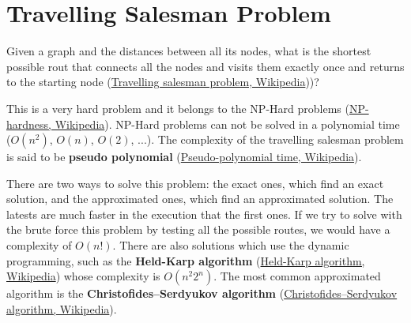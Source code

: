 \section{Travelling Salesman Problem}
Given a graph and the distances between all its nodes, what is the shortest possible rout that connects all the nodes and visits them exactly once and returns to the starting node \cite{wikitravsales} (\href{https://en.wikipedia.org/wiki/Travelling_salesman_problem}{Travelling salesman problem, Wikipedia}))?

This is a very hard problem and it belongs to the NP-Hard problems \cite{wikihphard} (\href{https://en.wikipedia.org/wiki/NP-hardness}{NP-hardness, Wikipedia}). NP-Hard problems can not be solved in a polynomial time (\(O(n^{2})\), \(O(n)\), \(O(2)\), ...). The complexity of the travelling salesman problem is said to be \textbf{pseudo polynomial} \cite{wikipseudo} (\href{https://en.wikipedia.org/wiki/Pseudo-polynomial_time}{Pseudo-polynomial time, Wikipedia}). 

There are two ways to solve this problem: the exact ones, which find an exact solution, and the approximated ones, which find an approximated solution. The latests are much faster in the execution that the first ones. If we try to solve with the brute force this problem by testing all the possible routes, we would have a complexity of \(O(n!)\). There are also solutions which use the dynamic programming, such as the \textbf{Held-Karp algorithm} \cite{wikiheldkarp} (\href{https://en.wikipedia.org/wiki/Held–Karp_algorithm}{Held-Karp algorithm, Wikipedia}) whose complexity is \(O(n^{2}2^{n})\). The most common approximated algorithm is the \textbf{Christofides–Serdyukov algorithm} \cite{wikichristofides} (\href{https://en.wikipedia.org/wiki/Christofides_algorithm}{Christofides–Serdyukov algorithm, Wikipedia}).